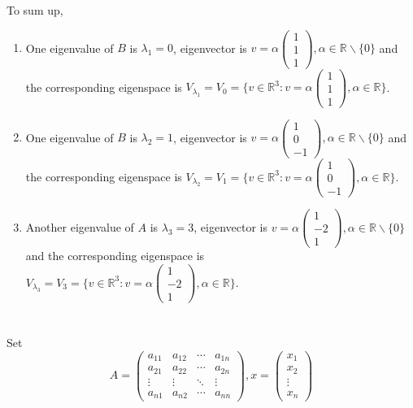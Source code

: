 \documentclass[a4paper,12pt,titlepage]{article}
\begin{document}
To sum up,
\begin{enumerate}
\item One eigenvalue of $B$ is $\lambda_1=0$, eigenvector is $v = \alpha\begin{pmatrix}
1\\1\\1\end{pmatrix},\alpha \in \mathbb{R} \backslash \lbrace0\rbrace$ and the corresponding eigenspace is
$V_{\lambda_1}=V_{0}=\lbrace v\in\mathbb{R}^3:v=\alpha\begin{pmatrix}
1\\1\\1\end{pmatrix} ,\alpha \in \mathbb{R} \rbrace$.

\item One eigenvalue of $B$ is $\lambda_2=1$, eigenvector is $v = \alpha\begin{pmatrix}
1\\0\\-1\end{pmatrix},\alpha \in \mathbb{R} \backslash \lbrace0\rbrace$ and the corresponding eigenspace is
$V_{\lambda_2}=V_{1}=\lbrace v\in\mathbb{R}^3:v=\alpha\begin{pmatrix}
1\\0\\-1\end{pmatrix} ,\alpha \in \mathbb{R} \rbrace$.

\item Another eigenvalue of $A$ is $\lambda_3=3$, eigenvector is $v = \alpha\begin{pmatrix}
1\\-2\\1\end{pmatrix},\alpha \in \mathbb{R} \backslash \lbrace0\rbrace$ and the corresponding eigenspace is
$V_{\lambda_3}=V_{3}=\lbrace v\in\mathbb{R}^3:v=\alpha\begin{pmatrix}
1\\-2\\1\end{pmatrix} ,\alpha \in \mathbb{R} \rbrace$.
\end{enumerate}

\section{}
Set $$A=\left(\begin{array}{cccc}
a_{11} & a_{12} & \cdots & a_{1n}\\
a_{21} & a_{22} & \cdots & a_{2n}\\
\vdots & \vdots & \ddots & \vdots\\
a_{n1} & a_{n2} & \cdots & a_{nn}
\end{array}\right),x=\left(\begin{array}{c}
x_1\\
x_2\\
\vdots\\
x_n
\end{array}\right)$$
\end{document}
